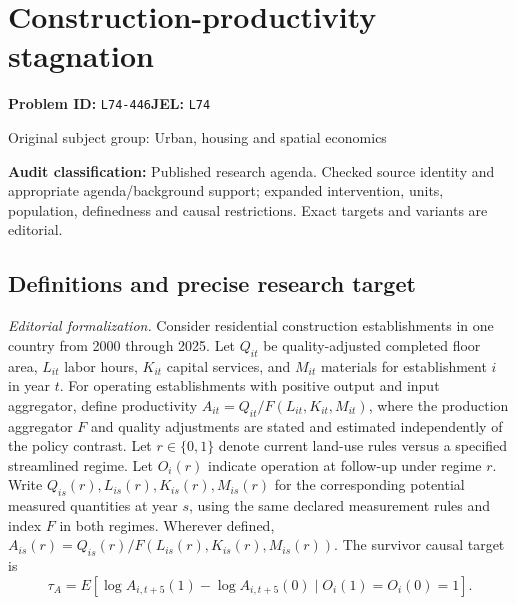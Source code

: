\documentclass[11pt,a4paper]{article}
\begin{document}
\section*{Construction-productivity stagnation}
\textbf{Problem ID:} \texttt{L74-446}\quad \textbf{JEL:} \texttt{L74}\par
\label{problem:OP-0462}
{\sffamily\small\color{muted}Original subject group: Urban, housing and spatial economics\par}
\label{definitions:problem:30007744}
\textbf{Audit classification:} Published research agenda. Checked source identity and appropriate agenda/background support; expanded intervention, units, population, definedness and causal restrictions. Exact targets and variants are editorial.
\subsection*{Definitions and precise research target}
\textit{Editorial formalization.} Consider residential construction establishments in one country from 2000 through 2025. Let \(Q_{it}\) be quality-adjusted completed floor area, \(L_{it}\) labor hours, \(K_{it}\) capital services, and \(M_{it}\) materials for establishment \(i\) in year \(t\). For operating establishments with positive output and input aggregator, define productivity \(A_{it}=Q_{it}/F(L_{it},K_{it},M_{it})\), where the production aggregator \(F\) and quality adjustments are stated and estimated independently of the policy contrast. Let \(r\in\{0,1\}\) denote current land-use rules versus a specified streamlined regime. Let \(O_i(r)\) indicate operation at follow-up under regime \(r\). Write \(Q_{is}(r),L_{is}(r),K_{is}(r),M_{is}(r)\) for the corresponding potential measured quantities at year \(s\), using the same declared measurement rules and index \(F\) in both regimes. Wherever defined, \(A_{is}(r)=Q_{is}(r)/F(L_{is}(r),K_{is}(r),M_{is}(r))\). The survivor causal target is
\[\tau_A=E[\log A_{i,t+5}(1)-\log A_{i,t+5}(0)\mid O_i(1)=O_i(0)=1].\]
\end{document}
